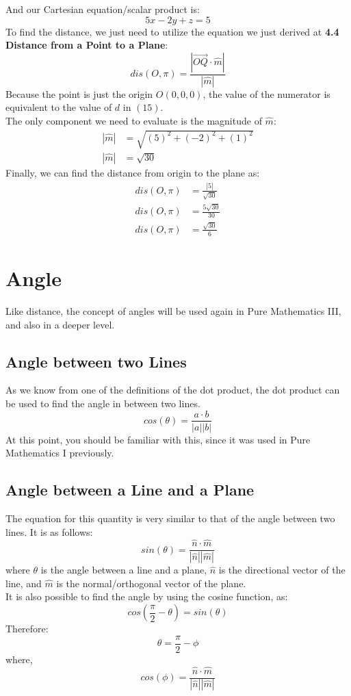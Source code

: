 \documentclass[hidelinks, a4paper, 12pt]{article}
\newcommand{\bd}{\textbf}
\newcommand{\nhat}{\hat{n}}
\newcommand{\mhat}{\hat{m}}
\newcommand{\n}{\\[\baselineskip]}
\begin{document}
                And our Cartesian equation/scalar product is:
                \[5x -2y + z = 5\]
                To find the distance, we just need to utilize the equation we just derived at \bd{4.4 Distance from a Point to a Plane}:
                \[dis(O, \pi) = \frac{|\vec{OQ}\cdot\mhat|}{|\mhat|}\]
                Because the point is just the origin $O(0, 0, 0)$, the value of the numerator is equivalent to the value of $d$ in $(15)$.\n
                The only component we need to evaluate is the magnitude of $\mhat$:
                \[\begin{split}
                    |\mhat| &= \sqrt{(5)^2+(-2)^2+(1)^2}\\
                    |\mhat| &= \sqrt{30}
                \end{split}\]
                Finally, we can find the distance from origin to the plane as:
                \[\begin{split}
                    dis(O, \pi) &= \frac{|5|}{\sqrt{30}}\\
                    dis(O, \pi) &= \frac{5\sqrt{30}}{30}\\
                    dis(O, \pi) &= \frac{\sqrt{30}}{6}
                \end{split}\]
        
    \section{Angle}
        Like distance, the concept of angles will be used again in Pure Mathematics III, and also in a deeper level.
        \subsection{Angle between two Lines}
            As we know from one of the definitions of the dot product, the dot product can be used to find the angle in between two lines.
            \[cos(\theta) = \frac{a\cdot b}{|a||b|}\]
            At this point, you should be familiar with this, since it was used in Pure Mathematics I previously.
        
        \subsection{Angle between a Line and a Plane}
            The equation for this quantity is very similar to that of the angle between two lines. It is as follows:
            \[sin(\theta) = \frac{\nhat\cdot \mhat}{|\nhat||\mhat|}\]
            where $\theta$ is the angle between a line and a plane, $\nhat$ is the directional vector of the line, and
            $\mhat$ is the normal/orthogonal vector of the plane.\n
            It is also possible to find the angle by using the cosine function, as:
            \[cos\left(\frac{\pi}{2} - \theta\right) = sin(\theta)\]
            Therefore:
            \[\theta = \frac{\pi}{2} - \phi\]
            where,
            \[cos(\phi) = \frac{\nhat\cdot \mhat}{|\nhat||\mhat|}\]
\end{document}
